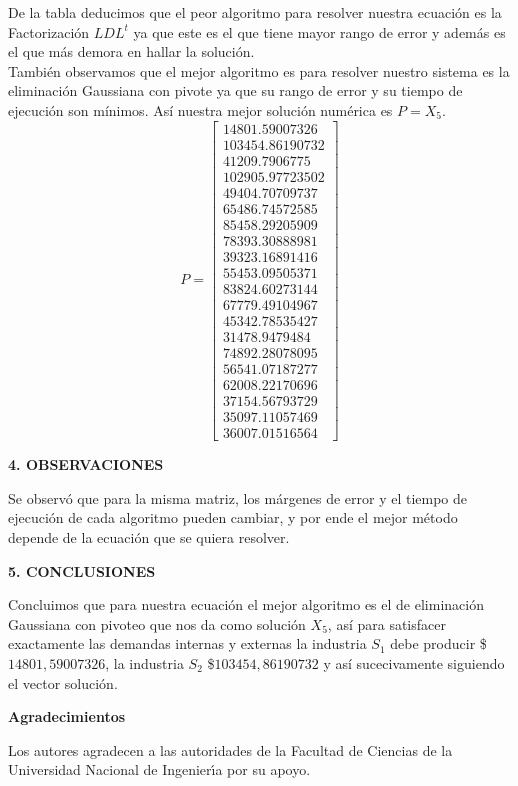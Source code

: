 \documentclass[10pt,a4paper]{article}
\begin{document}
\begin{multicols}{2}
	\noindent De la tabla deducimos que el peor algoritmo para resolver nuestra ecuación es la Factorización $LDL^t$ ya que este es el que tiene mayor rango de error y además es el que más demora en hallar la solución.\\ También observamos que el mejor algoritmo es para resolver nuestro sistema es la eliminación Gaussiana con pivote ya que su rango de error y su tiempo de ejecución son mínimos. Así nuestra mejor solución numérica es $P=X_5$.
	\begin{equation*}
	P=
	\begin{bmatrix}
	14801.59007326\\  
	103454.86190732\\   
	41209.7906775 \\
	102905.97723502\\   
	49404.70709737\\   
	65486.74572585\\
	85458.29205909\\   
	78393.30888981\\   
	39323.16891416\\
	55453.09505371\\   
	83824.60273144\\   
	67779.49104967\\
	45342.78535427\\   
	31478.9479484 \\   
	74892.28078095\\
	56541.07187277\\   
	62008.22170696\\   
	37154.56793729\\
	35097.11057469\\   
	36007.01516564
	\end{bmatrix}
	\end{equation*}
	
\begin{center}
{\large \bf 4. OBSERVACIONES}
\end{center}
Se observó que para la misma matriz, los márgenes de error y el tiempo de ejecución de cada algoritmo pueden cambiar, y por ende el mejor método depende de la ecuación que se quiera resolver.\\
\begin{center}
{\large \bf 5. CONCLUSIONES}
\end{center}
Concluimos que para nuestra ecuación el mejor algoritmo es el de eliminación Gaussiana con pivoteo que nos da como solución $X_5$, así para satisfacer exactamente las demandas internas y externas la industria $S_1$ debe producir  \$$14801,59007326$, la  industria $S_2$ \$$103454,86190732$ y así sucecivamente siguiendo el vector solución.
\begin{center}
{\large \bf Agradecimientos}
\end{center}
Los autores agradecen a las autoridades de la Facultad de Ciencias de la Universidad Nacional de 
Ingenier\'{\i}a por su apoyo.

\end{multicols}
\end{document}
